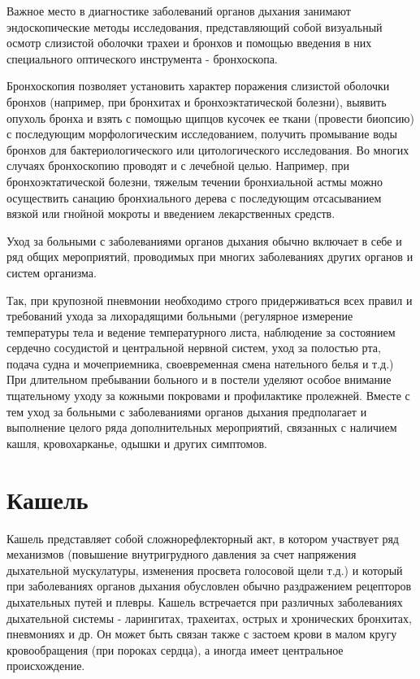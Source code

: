 \documentclass[a4paper,14pt]{extreport}
\begin{document}
Важное место в диагностике заболеваний органов дыхания занимают эндоскопические методы исследования, представляющий собой визуальный осмотр слизистой оболочки трахеи и бронхов и помощью введения в них специального оптического инструмента - бронхоскопа.  

Бронхоскопия позволяет установить характер поражения слизистой оболочки бронхов (например, при бронхитах и бронхоэктатической болезни), выявить опухоль бронха и взять с помощью щипцов кусочек ее ткани (провести биопсию) с последующим морфологическим исследованием, получить промывание воды бронхов для бактериологического или цитологического исследования. Во многих случаях бронхоскопию проводят и с лечебной целью. Например, при бронхоэктатической болезни, тяжелым течении бронхиальной астмы можно осуществить санацию бронхиального дерева с последующим отсасыванием вязкой или гнойной мокроты и введением лекарственных средств.    

Уход за больными с заболеваниями органов дыхания обычно включает в себе и ряд общих мероприятий, проводимых при многих заболеваниях других органов и систем организма. 

Так, при крупозной пневмонии необходимо строго придерживаться всех правил и требований ухода за лихорадящими больными (регулярное измерение температуры тела и ведение температурного листа, наблюдение за состоянием сердечно сосудистой и центральной нервной систем, уход за полостью рта, подача судна и мочеприемника, своевременная смена нательного белья и т.д.) При длительном пребывании больного и в постели уделяют особое внимание тщательному уходу за кожными покровами и профилактике пролежней. Вместе с тем уход за больными с заболеваниями органов дыхания предполагает и выполнение целого ряда дополнительных мероприятий, связанных с наличием кашля, кровохарканье, одышки и других симптомов.       

\section{Кашель}
Кашель  представляет собой сложнорефлекторный акт, в котором участвует ряд механизмов (повышение внутригрудного давления за счет напряжения дыхательной мускулатуры, изменения просвета голосовой щели т.д.) и который при заболеваниях органов дыхания обусловлен обычно раздражением рецепторов дыхательных путей и плевры. Кашель встречается при различных заболеваниях дыхательной системы - ларингитах, трахеитах, острых и хронических бронхитах, пневмониях и др. Он может быть связан также с застоем крови в малом кругу кровообращения (при пороках сердца), а иногда имеет центральное происхождение.
\end{document}
